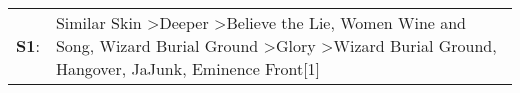 \begin{supertabular}{p{0.03\textwidth}p{0.92\textwidth}}
 \textbf{S1}:  &  Similar Skin\textsuperscript{} \textgreater \enspace Deeper\textsuperscript{} \textgreater \enspace Believe the Lie\textsuperscript{}, \enspace Women Wine and Song\textsuperscript{}, \enspace Wizard Burial Ground\textsuperscript{} \textgreater \enspace Glory\textsuperscript{} \textgreater \enspace Wizard Burial Ground\textsuperscript{}, \enspace Hangover\textsuperscript{}, \enspace JaJunk\textsuperscript{}, \enspace Eminence Front[1]\textsuperscript{}  \enspace  \\
\end{supertabular}
